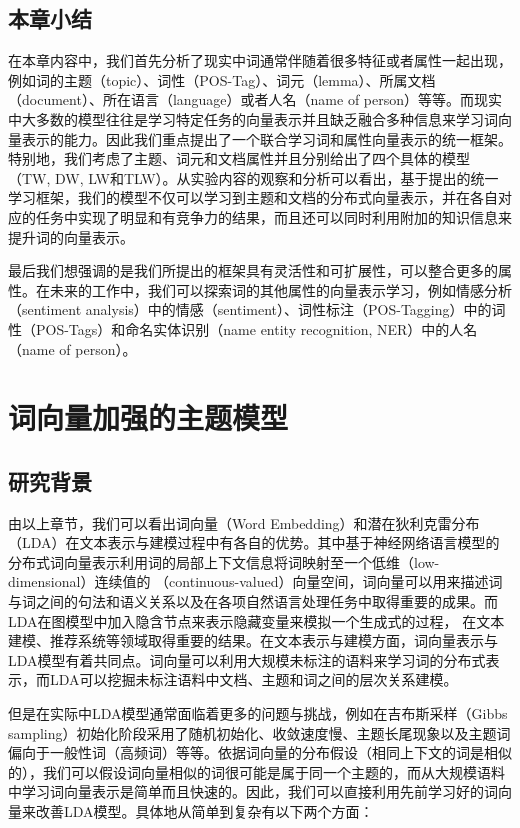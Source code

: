 \documentclass[master]{njuthesis}
\begin{document}
\section{本章小结}\label{sec_conclusions_chap4}

在本章内容中，我们首先分析了现实中词通常伴随着很多特征或者属性一起出现，例如词的主题（topic）、词性（POS-Tag）、词元（lemma）、所属文档（document）、所在语言（language）或者人名（name of person）等等。而现实中大多数的模型往往是学习特定任务的向量表示并且缺乏融合多种信息来学习词向量表示的能力。因此我们重点提出了一个联合学习词和属性向量表示的统一框架。特别地，我们考虑了主题、词元和文档属性并且分别给出了四个具体的模型（TW, DW, LW和TLW）。从实验内容的观察和分析可以看出，基于提出的统一学习框架，我们的模型不仅可以学习到主题和文档的分布式向量表示，并在各自对应的任务中实现了明显和有竞争力的结果，而且还可以同时利用附加的知识信息来提升词的向量表示。

最后我们想强调的是我们所提出的框架具有灵活性和可扩展性，可以整合更多的属性。在未来的工作中，我们可以探索词的其他属性的向量表示学习，例如情感分析（sentiment analysis）中的情感（sentiment）、词性标注（POS-Tagging）中的词性（POS-Tags）和命名实体识别（name entity recognition, NER）中的人名（name of person）。


\chapter{词向量加强的主题模型}\label{chapter5_embedding_topic_model}

\section{研究背景}\label{sec_bg_chap5}

由以上章节，我们可以看出词向量（Word Embedding）和潜在狄利克雷分布（LDA）在文本表示与建模过程中有各自的优势。其中基于神经网络语言模型的分布式词向量表示利用词的局部上下文信息将词映射至一个低维（low-dimensional）连续值的 （continuous-valued）向量空间，词向量可以用来描述词与词之间的句法和语义关系以及在各项自然语言处理任务中取得重要的成果\cite{mikolov2013efficient,le2014distributed}。而LDA在图模型中加入隐含节点来表示隐藏变量来模拟一个生成式的过程， 在文本建模、推荐系统等领域取得重要的结果\cite{blei2003latent}。在文本表示与建模方面，词向量表示与LDA模型有着共同点。词向量可以利用大规模未标注的语料来学习词的分布式表示，而LDA可以挖掘未标注语料中文档、主题和词之间的层次关系建模。

但是在实际中LDA模型通常面临着更多的问题与挑战，例如在吉布斯采样（Gibbs sampling）初始化阶段采用了随机初始化、收敛速度慢、主题长尾现象以及主题词偏向于一般性词（高频词）等等。依据词向量的分布假设（相同上下文的词是相似的），我们可以假设词向量相似的词很可能是属于同一个主题的，而从大规模语料中学习词向量表示是简单而且快速的。因此，我们可以直接利用先前学习好的词向量来改善LDA模型。具体地从简单到复杂有以下两个方面：
\end{document}

